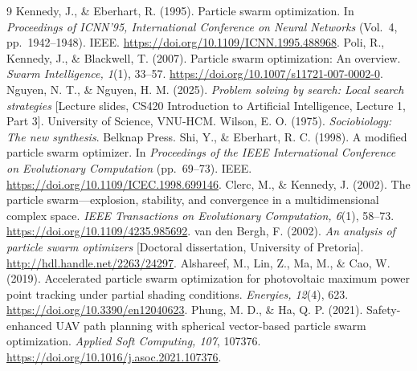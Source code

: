 \documentclass[11pt,a4paper]{article}
\begin{document}
\begin{thebibliography}{9}\small
\setlength{\itemsep}{4pt}
 Kennedy, J., \& Eberhart, R. (1995). Particle swarm optimization. In \textit{Proceedings of ICNN'95, International Conference on Neural Networks} (Vol.~4, pp.~1942--1948). IEEE. \url{https://doi.org/10.1109/ICNN.1995.488968}.
 Poli, R., Kennedy, J., \& Blackwell, T. (2007). Particle swarm optimization: An overview. \textit{Swarm Intelligence, 1}(1), 33--57. \url{https://doi.org/10.1007/s11721-007-0002-0}.
 Nguyen, N. T., \& Nguyen, H. M. (2025). \textit{Problem solving by search: Local search strategies} [Lecture slides, CS420 Introduction to Artificial Intelligence, Lecture 1, Part 3]. University of Science, VNU-HCM.
 Wilson, E. O. (1975). \textit{Sociobiology: The new synthesis}. Belknap Press.
 Shi, Y., \& Eberhart, R. C. (1998). A modified particle swarm optimizer. In \textit{Proceedings of the IEEE International Conference on Evolutionary Computation} (pp.~69--73). IEEE. \url{https://doi.org/10.1109/ICEC.1998.699146}.
 Clerc, M., \& Kennedy, J. (2002). The particle swarm---explosion, stability, and convergence in a multidimensional complex space. \textit{IEEE Transactions on Evolutionary Computation, 6}(1), 58--73. \url{https://doi.org/10.1109/4235.985692}.
 van den Bergh, F. (2002). \textit{An analysis of particle swarm optimizers} [Doctoral dissertation, University of Pretoria]. \url{http://hdl.handle.net/2263/24297}.
 Alshareef, M., Lin, Z., Ma, M., \& Cao, W. (2019). Accelerated particle swarm optimization for photovoltaic maximum power point tracking under partial shading conditions. \textit{Energies, 12}(4), 623. \url{https://doi.org/10.3390/en12040623}.
 Phung, M. D., \& Ha, Q. P. (2021). Safety-enhanced UAV path planning with spherical vector-based particle swarm optimization. \textit{Applied Soft Computing, 107}, 107376. \url{https://doi.org/10.1016/j.asoc.2021.107376}.
\end{thebibliography}
\end{document}
